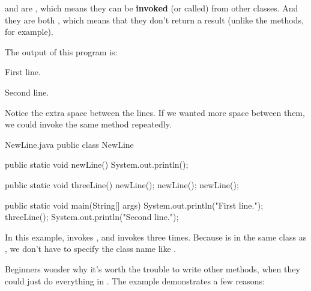 
 and  are , which means they can be {\bf invoked} (or called) from other classes.
And they are both , which means that they don't return a result (unlike the  methods, for example).

The output of this program is:

\begin{stdout}
First line.

Second line.
\end{stdout}

Notice the extra space between the lines.
If we wanted more space between them, we could invoke the same method repeatedly.


\begin{trinket}{NewLine.java}
public class NewLine {

    public static void newLine() {
        System.out.println();
    }

    public static void threeLine() {
        newLine();
        newLine();
        newLine();
    }

    public static void main(String[] args) {
        System.out.println("First line.");
        threeLine();
        System.out.println("Second line.");
    }
}
\end{trinket}

In this example,  invokes , and  invokes  three times.
Because  is in the same class as , we don't have to specify the class name like .

Beginners wonder why it's worth the trouble to write other methods, when they could just do everything in .
The  example demonstrates a few reasons:

